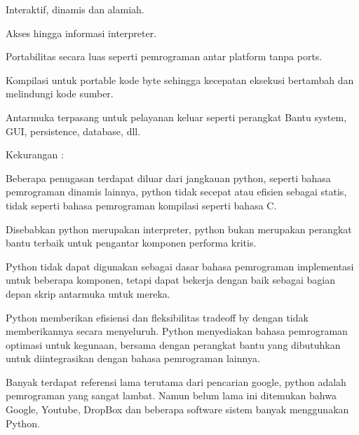 \noindent 
{\fontsize{14pt}{14pt}\selectfont Interaktif, dinamis dan alamiah. \\} \par
\noindent 
{\fontsize{14pt}{14pt}\selectfont Akses hingga informasi interpreter. \\} \par
\noindent 
{\fontsize{14pt}{14pt}\selectfont Portabilitas secara luas seperti pemrograman antar platform tanpa ports. \\} \par
\noindent 
{\fontsize{14pt}{14pt}\selectfont Kompilasi untuk portable kode byte sehingga kecepatan eksekusi bertambah dan melindungi kode sumber. \\} \par
\noindent 
{\fontsize{14pt}{14pt}\selectfont Antarmuka terpasang untuk pelayanan keluar seperti perangkat Bantu system, GUI, persistence, database, dll. \\} \par
\noindent 
{\fontsize{14pt}{14pt}\selectfont Kekurangan : \\} \par
\noindent 
{\fontsize{14pt}{14pt}\selectfont Beberapa penugasan terdapat diluar dari jangkauan python, seperti bahasa pemrograman dinamis lainnya, python tidak secepat atau efisien sebagai statis, tidak seperti bahasa pemrograman kompilasi seperti bahasa C. \\} \par
\noindent 
{\fontsize{14pt}{14pt}\selectfont Disebabkan python merupakan interpreter, python bukan merupakan perangkat bantu terbaik untuk pengantar komponen performa kritis. \\} \par
\noindent 
{\fontsize{14pt}{14pt}\selectfont Python tidak dapat digunakan sebagai dasar bahasa pemrograman implementasi untuk beberapa komponen, tetapi dapat bekerja dengan baik sebagai bagian depan skrip antarmuka untuk mereka. \\} \par
\noindent 
{\fontsize{14pt}{14pt}\selectfont Python memberikan efisiensi dan fleksibilitas tradeoff by dengan tidak memberikannya secara menyeluruh. Python menyediakan bahasa pemrograman optimasi untuk kegunaan, bersama dengan perangkat bantu yang dibutuhkan untuk diintegrasikan dengan bahasa pemrograman lainnya. \\} \par
\noindent 
{\fontsize{14pt}{14pt}\selectfont Banyak terdapat referensi lama terutama dari pencarian google, python adalah pemrograman yang sangat lambat. Namun belum lama ini ditemukan bahwa Google, Youtube, DropBox dan beberapa software sistem banyak menggunakan Python. \\} \par
